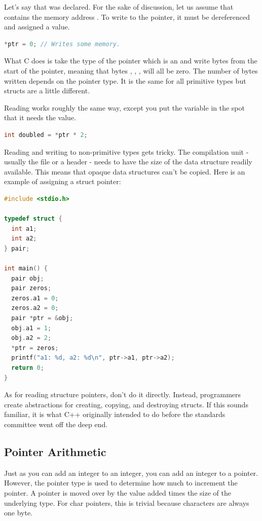 Let's say that  was declared.
For the sake of discussion, let us assume that  contains the memory address .
To write to the pointer, it must be dereferenced and assigned a value.

\begin{lstlisting}[language=C]
*ptr = 0; // Writes some memory.
\end{lstlisting}

What C does is take the type of the pointer which is an  and write  bytes from the start of the pointer, meaning that bytes , , ,  will all be zero.
The number of bytes written depends on the pointer type.
It is the same for all primitive types but structs are a little different.

Reading works roughly the same way, except you put the variable in the spot that it needs the value.

\begin{lstlisting}[language=C]
int doubled = *ptr * 2;
\end{lstlisting}

Reading and writing to non-primitive types gets tricky.
The compilation unit - usually the file or a header - needs to have the size of the data structure readily available.
This means that opaque data structures can't be copied.
Here is an example of assigning a struct pointer:

\begin{lstlisting}[language=C]
#include <stdio.h>

typedef struct {
  int a1;
  int a2;
} pair;

int main() {
  pair obj;
  pair zeros;
  zeros.a1 = 0;
  zeros.a2 = 0;
  pair *ptr = &obj;
  obj.a1 = 1;
  obj.a2 = 2;
  *ptr = zeros;
  printf("a1: %d, a2: %d\n", ptr->a1, ptr->a2);
  return 0;
}
\end{lstlisting}

As for reading structure pointers, don't do it directly.
Instead, programmers create abstractions for creating, copying, and destroying structs.
If this sounds familiar, it is what C++ originally intended to do before the standards committee went off the deep end.

\subsection{Pointer Arithmetic}

Just as you can add an integer to an integer, you can add an integer to a pointer.
However, the pointer type is used to determine how much to increment the pointer.
A pointer is moved over by the value added times the size of the underlying type.
For char pointers, this is trivial because characters are always one byte.

